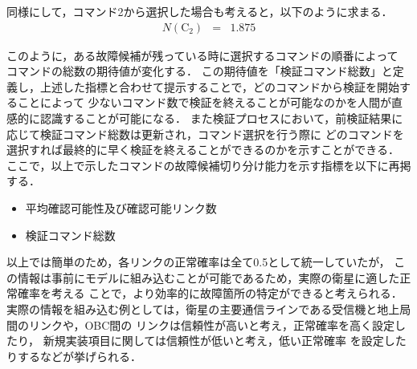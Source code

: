 \documentclass[11pt]{jsreport}
\begin{document}
同様にして，コマンド2から選択した場合も考えると，以下のように求まる．
\begin{eqnarray}
   N(\text{C}_2)  &=& 1.875 %
\end{eqnarray}

このように，ある故障候補が残っている時に選択するコマンドの順番によって
コマンドの総数の期待値が変化する．
この期待値を「検証コマンド総数」と定義し，上述した指標と合わせて提示することで，どのコマンドから検証を開始することによって
少ないコマンド数で検証を終えることが可能なのかを人間が直感的に認識することが可能になる．
また検証プロセスにおいて，前検証結果に応じて検証コマンド総数は更新され，コマンド選択を行う際に
どのコマンドを選択すれば最終的に早く検証を終えることができるのかを示すことができる．\\
ここで，以上で示したコマンドの故障候補切り分け能力を示す指標を以下に再掲する．
\begin{itemize}
   \item 平均確認可能性及び確認可能リンク数
   \item 検証コマンド総数
\end{itemize}

以上では簡単のため，各リンクの正常確率は全て0.5として統一していたが，
この情報は事前にモデルに組み込むことが可能であるため，実際の衛星に適した正常確率を考える
ことで，より効率的に故障箇所の特定ができると考えられる．
実際の情報を組み込む例としては，衛星の主要通信ラインである受信機と地上局間のリンクや，OBC間の
リンクは信頼性が高いと考え，正常確率を高く設定したり，
新規実装項目に関しては信頼性が低いと考え，低い正常確率
を設定したりするなどが挙げられる．
\end{document}
